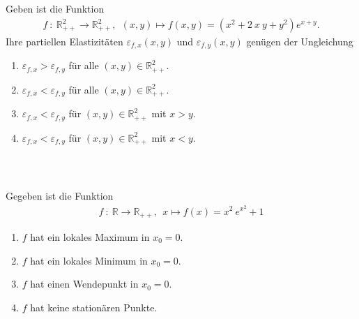 \subsection*{}
Geben ist die Funktion
\begin{align*}
f \ : \ \mathbb{R}^2_{++} \to \mathbb{R}^2_{++},
\ \
(x,y) \mapsto f(x,y) = (x^2 + 2\ x \ y + y^2) e^{x+y}. 
\end{align*}
Ihre partiellen Elastizitäten $ \varepsilon_{f,x}(x,y) $ und
$ \varepsilon_{f,y}(x,y) $ genügen der Ungleichung
\renewcommand{\labelenumi}{(\alph{enumi})}
\begin{enumerate}
\item 
$ \varepsilon_{f,x} > \varepsilon_{f,y}  $ für alle $ (x,y) \in \mathbb{R}^2_{++} $.
\item
$ \varepsilon_{f,x} < \varepsilon_{f,y}  $ für alle $ (x,y) \in \mathbb{R}^2_{++} $.
\item
$ \varepsilon_{f,x} < \varepsilon_{f,y}  $ für $ (x,y) \in \mathbb{R}^2_{++} $ mit $ x > y $.
\item
$ \varepsilon_{f,x} < \varepsilon_{f,y}  $ für $ (x,y) \in \mathbb{R}^2_{++} $ mit $ x < y $.
\end{enumerate}
\ \\
\subsection*{}

\renewcommand{\labelenumi}{(\alph{enumi})}
Gegeben ist die Funktion
\begin{align*}
f \ : \ \mathbb{R} \to \mathbb{R}_{++}, \ \ 
x \mapsto f(x) = x^2 \ e^{x^2} + 1
\end{align*}
\begin{enumerate}
\item 
$ f $ hat ein lokales Maximum in $ x_0 = 0 $.
\item
$ f $ hat ein lokales Minimum in $ x_0 = 0 $.
\item
$ f $ hat einen Wendepunkt in $ x_0 = 0 $.
\item
$ f $ hat keine stationären Punkte.
\end{enumerate}
\ \\
